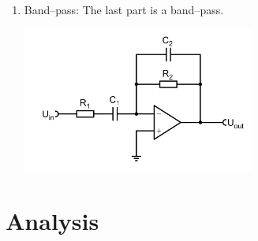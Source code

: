 \documentclass[a4paper,10pt]{article}
\newenvironment{Figure}
        {\par\medskip\noindent\minipage{\linewidth}}
        {\endminipage\par\medskip} %
\numberwithin{equation}{section}
\begin{document}
\begin{multicols}{2}
\begin{enumerate}[label=\arabic*]
\begin{Figure}
                        \end{Figure}
                \item Band--pass:
                        The last part is a band--pass.
                        \begin{Figure}
                                \centering
                                \includegraphics[width=0.6\textwidth]{bandpass.png}
                        \end{Figure}
        \end{enumerate}
        
        \clearpage
        \section{Analysis}
        

\end{multicols}
\end{document}
